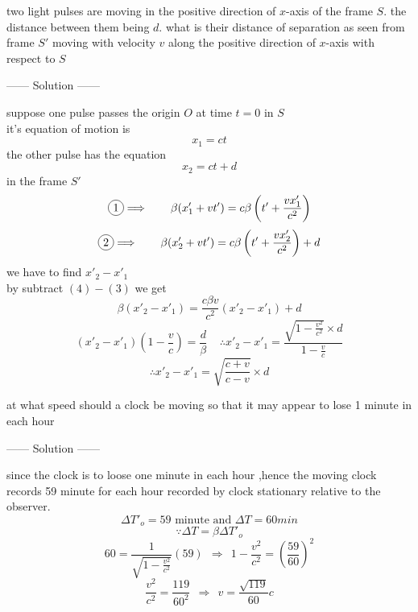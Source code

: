 \documentclass{article}
\begin{document}
\begin{example}
    two light pulses are moving in the positive direction of $x$-axis of the frame $S$. the distance between them being $d$. what is their distance of separation as seen from frame $S'$ moving with velocity $v$ along the positive direction of $x$-axis with respect to $S$
    \begin{center}
        ------ \textcolor{Solution}{Solution} ------
    \end{center}
    suppose one pulse passes the origin $O$ at time $t=0$ in $S$\\
    it's equation of motion is 
    \setcounter{equation}{0}
    \begin{equation}
        x_1=ct
    \end{equation}
    the other pulse has the equation
    \begin{equation}
        x_2=ct+d
    \end{equation}
    in the frame $S'$
    \begin{equation}
    \circled{1}  \Longrightarrow  \ \ \ \ \ \ \beta(x'_1+vt') = c\beta\left(t'+\frac{vx'_1}{c^2}\right)
    \end{equation}
    \begin{equation}
        \circled{2}  \Longrightarrow  \ \ \ \ \ \ \beta(x'_2+vt') = c\beta\left(t'+\frac{vx'_2}{c^2}\right) + d
    \end{equation}
    we have to find $x'_2-x'_1$\\
    by subtract $(4)-(3)$ we get
    \[
    \beta(x'_2-x'_1)=\frac{c\beta v}{c^2}(x'_2-x'_1) + d
    \]
    \[
    (x'_2-x'_1)(1-\frac{v}{c})=\frac{d}{\beta} \ \ \ \ \ \therefore x'_2-x'_1 = \frac{\sqrt{1-\frac{v^2}{c^2}} \times d}{1-\frac{v}{c}}
    \]
    \[
    \therefore x'_2-x'_1 = \sqrt{\frac{c+v}{c-v}} \times d
    \]
\end{example}
\begin{example}
    at what speed should a clock be moving so that it may appear to lose 1 minute in each hour
\begin{center}
    ------ \textcolor{Solution}{Solution} ------
\end{center}
    since the clock is to loose one minute in each hour ,hence the moving clock records 59 minute for each hour recorded by clock stationary relative to the observer.\\
    \[
    \Delta T'_o = 59\text{ minute \ \ \ \ and\ \ }\Delta T=60 \si{min}
    \]
    \[
    \because \Delta T = \beta\Delta T'_o 
    \]
    \[
    60 = \frac{1}{\sqrt{1-\frac{v^2}{c^2}}}(59) \ \ \Longrightarrow \ \  1-\frac{v^2}{c^2} = {\left(\frac{59}{60}\right)}^2
    \]
    \[
    \frac{v^2}{c^2} = \frac{119}{60^2} \ \ \Longrightarrow \ \ v=\frac{\sqrt{119}}{60}c
    \]
\end{example}
\end{document}

